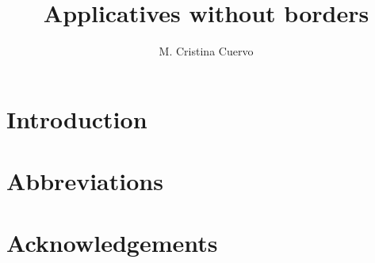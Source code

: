 \documentclass[output=paper]{langsci/langscibook}
\author{M. Cristina Cuervo\affiliation{}}
\title{Applicatives without borders}
\begin{document}
\section{Introduction}  
 
\section*{Abbreviations}
\section*{Acknowledgements}

\sloppy
\printbibliography[heading=subbibliography,notkeyword=this] 
\end{document}
